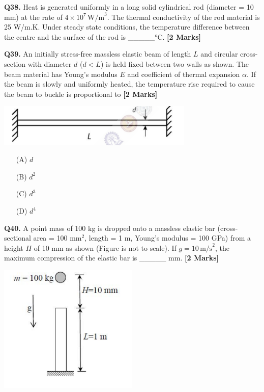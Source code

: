 \documentclass[11pt]{article}
\newcommand{\questionb}[2]{
    \noindent\textbf{Q#2.} #1 \hfill \textbf{[2 Marks]}
}
\begin{document}
\questionb{Heat is generated uniformly in a long solid cylindrical rod (diameter = 10 mm) at the rate of \( 4 \times 10^7 \, \text{W/m}^3 \). The thermal conductivity of the rod material is 25 W/m.K. Under steady state conditions, the temperature difference between the centre and the surface of the rod is \_\_\_\_\_°C.}{38}
\vspace{0.5cm}

\questionb{An initially stress-free massless elastic beam of length \( L \) and circular cross-section with diameter \( d \) (\( d < L \)) is held fixed between two walls as shown. The beam material has Young's modulus \( E \) and coefficient of thermal expansion \( \alpha \). If the beam is slowly and uniformly heated, the temperature rise required to cause the beam to buckle is proportional to}{39}
\begin{center}
\includegraphics[width=0.7\textwidth]{figures/39.png}
\end{center}
\begin{enumerate}
    \item[(A)] \( d \)
    \item[(B)] \( d^2 \)
    \item[(C)] \( d^3 \)
    \item[(D)] \( d^4 \)
\end{enumerate}
\vspace{0.5cm}

\questionb{A point mass of 100 kg is dropped onto a massless elastic bar (cross-sectional area = 100 mm\(^2\), length = 1 m, Young's modulus = 100 GPa) from a height \( H \) of 10 mm as shown (Figure is not to scale). If \( g = 10 \, \text{m/s}^2 \), the maximum compression of the elastic bar is \_\_\_\_\_ mm.}{40}
\begin{center}
\includegraphics[width=0.5\textwidth]{figures/40.png}
\end{center}
\vspace{0.5cm}
\end{document}
